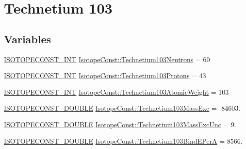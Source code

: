 \hypertarget{group___isotope_const-_technetium-_tc103}{}\section{Technetium 103}
\label{group___isotope_const-_technetium-_tc103}
\subsection*{Variables}
\begin{DoxyCompactItemize}
\item 
\mbox{\hyperlink{group___isotope_const-_macros_ga5f18360b3e99483a35c32d789e62621c}{I\+S\+O\+T\+O\+P\+E\+C\+O\+N\+S\+T\+\_\+\+I\+NT}} \mbox{\hyperlink{group___isotope_const-_technetium-_tc103_gabfb15286bf310d6f90afd837999bf77a}{Isotope\+Const\+::\+Technetium103\+Neutrons}} = 60
\item 
\mbox{\hyperlink{group___isotope_const-_macros_ga5f18360b3e99483a35c32d789e62621c}{I\+S\+O\+T\+O\+P\+E\+C\+O\+N\+S\+T\+\_\+\+I\+NT}} \mbox{\hyperlink{group___isotope_const-_technetium-_tc103_ga1bf1863039933e9c811da2101daa00bb}{Isotope\+Const\+::\+Technetium103\+Protons}} = 43
\item 
\mbox{\hyperlink{group___isotope_const-_macros_ga5f18360b3e99483a35c32d789e62621c}{I\+S\+O\+T\+O\+P\+E\+C\+O\+N\+S\+T\+\_\+\+I\+NT}} \mbox{\hyperlink{group___isotope_const-_technetium-_tc103_ga288b54d181f7ebcf594563d62eb1a5b7}{Isotope\+Const\+::\+Technetium103\+Atomic\+Weight}} = 103
\item 
\mbox{\hyperlink{group___isotope_const-_macros_ga8f45a7272ce02c0b4c65c44636ed719a}{I\+S\+O\+T\+O\+P\+E\+C\+O\+N\+S\+T\+\_\+\+D\+O\+U\+B\+LE}} \mbox{\hyperlink{group___isotope_const-_technetium-_tc103_gaa528c90070e24d6ef76565c518852f37}{Isotope\+Const\+::\+Technetium103\+Mass\+Exc}} = -\/84603.
\item 
\mbox{\hyperlink{group___isotope_const-_macros_ga8f45a7272ce02c0b4c65c44636ed719a}{I\+S\+O\+T\+O\+P\+E\+C\+O\+N\+S\+T\+\_\+\+D\+O\+U\+B\+LE}} \mbox{\hyperlink{group___isotope_const-_technetium-_tc103_ga6d790103b1b7b12ea16a2e0dec85a652}{Isotope\+Const\+::\+Technetium103\+Mass\+Exc\+Unc}} = 9.
\item 
\mbox{\hyperlink{group___isotope_const-_macros_ga8f45a7272ce02c0b4c65c44636ed719a}{I\+S\+O\+T\+O\+P\+E\+C\+O\+N\+S\+T\+\_\+\+D\+O\+U\+B\+LE}} \mbox{\hyperlink{group___isotope_const-_technetium-_tc103_ga993799e3a9a34366124d286a998c10c4}{Isotope\+Const\+::\+Technetium103\+Bind\+E\+PerA}} = 8566.
\item 

\end{DoxyCompactItemize}
